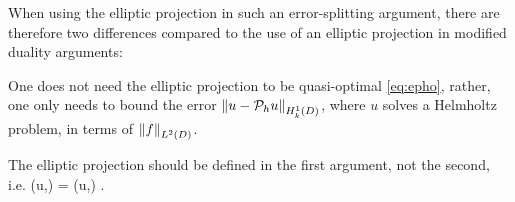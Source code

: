 
When using the elliptic projection in such an error-splitting argument, there are therefore two differences compared to the use of an elliptic projection in modified duality arguments:
\ben
\item One does not need the elliptic projection to be quasi-optimal \cref{eq:epho}, rather, one only needs to bound the error $\NHokD{u-\Ph u}$, where $u$ solves a Helmholtz problem, in terms of $\NLtD{f}$.
\item The elliptic projection should be defined in the first argument, not the second, i.e.
  \beq\label{eq:ellprojfirst}
\aT(\Ph u,\vh) = \aT(u,\vh) \tforall \vh \in \Vhp.
  \eeq
\een






